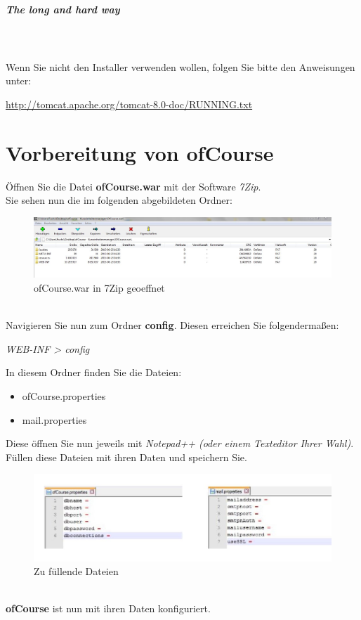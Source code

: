 \documentclass[a4paper, 12pt]{scrreprt}
\begin{document}
\paragraph{The long and hard way}\ \\
\ \\
Wenn Sie nicht den Installer verwenden wollen, folgen Sie bitte den Anweisungen unter:
\begin{center}
	\url{http://tomcat.apache.org/tomcat-8.0-doc/RUNNING.txt}
\end{center}

\chapter{Vorbereitung von ofCourse}
Öffnen Sie die Datei \textbf{ofCourse.war} mit der Software {\it 7Zip}.\\
Sie sehen nun die im folgenden abgebildeten Ordner:
\begin{figure}[h]
\centering
\includegraphics[width=1.0\linewidth]{Grafiken/7ZipOfCourse1}
\caption{ofCourse.war in 7Zip geoeffnet}
\label{fig:7ZipOfCourse1}
\end{figure}\\
Navigieren Sie nun zum Ordner \textbf{config}. Diesen erreichen Sie folgendermaßen:
\begin{center}
	{\it WEB-INF > config}
\end{center}
In diesem Ordner finden Sie die Dateien:
\begin{itemize}
	\item ofCourse.properties
	\item mail.properties
\end{itemize}
Diese öffnen Sie nun jeweils mit {\it Notepad++ (oder einem Texteditor Ihrer Wahl)}. Füllen diese Dateien mit ihren Daten und speichern Sie. 
\begin{figure}[h]
\centering
\includegraphics[width=0.7\linewidth]{Grafiken/propertiesComplete}
\caption{Zu füllende Dateien}
\label{fig:propertiesComplete}
\end{figure}\ \\
\textbf{ofCourse} ist nun mit ihren Daten konfiguriert.\\
\end{document}

